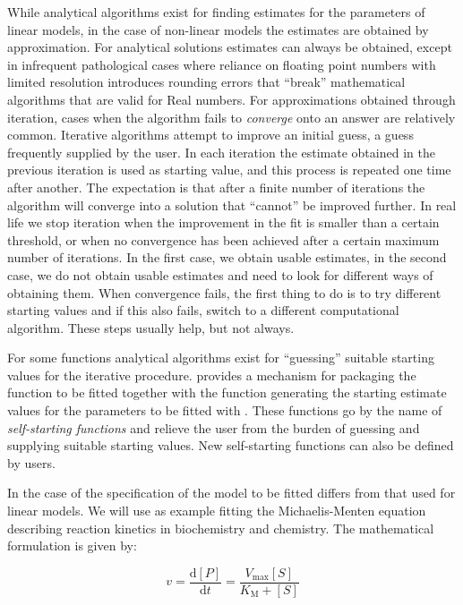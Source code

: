 \documentclass[krantz2]{krantz}\usepackage{knitr}%
\begin{document}
While analytical algorithms exist for finding estimates for the parameters of linear models, in the case of non-linear models the estimates are obtained by approximation. For analytical solutions estimates can always be obtained, except in infrequent pathological cases where reliance on floating point numbers with limited resolution introduces rounding errors that ``break'' mathematical algorithms that are valid for Real numbers. For approximations obtained through iteration, cases when the algorithm fails to \emph{converge} onto an answer are relatively common. Iterative algorithms attempt to improve an initial guess, a guess frequently supplied by the user. In each iteration the estimate obtained in the previous iteration is used as starting value, and this process is repeated one time after another. The expectation is that after a finite number of iterations the algorithm will converge into a solution that ``cannot'' be improved further. In real life we stop iteration when the improvement in the fit is smaller than a certain threshold, or when no convergence has been achieved after a certain maximum number of iterations. In the first case, we obtain usable estimates, in the second case, we do not obtain usable estimates and need to look for different ways of obtaining them. When convergence fails, the first thing to do is to try different starting values and if this also fails, switch to a different computational algorithm. These steps usually help, but not always. 

For some functions analytical algorithms exist for ``guessing'' suitable starting values for the iterative procedure. \Rlang provides a mechanism for packaging the function to be fitted together with the function generating the starting estimate values for the parameters to be fitted with . These functions go by the name of \emph{self-starting functions} and relieve the user from the burden of guessing and supplying suitable starting values. New self-starting functions can also be defined by users.

In the case of  the specification of the model to be fitted differs from that used for linear models. We will use as example fitting the Michaelis-Menten equation describing reaction kinetics in biochemistry and chemistry. The mathematical formulation is given by:

\begin{equation}\label{eq:michaelis:menten}
v = \frac{\mathrm{d} [P]}{\mathrm{d} t} = \frac{V_{\mathrm{max}} [S]}{K_{\mathrm{M}} + [S]}
\end{equation}
\end{document}
